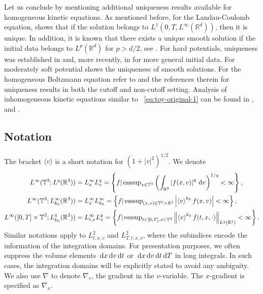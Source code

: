 \documentclass[11pt,american, reqno]{amsart}
\numberwithin{equation}{section}
\newcommand{\R}{\mathbb R}
\newcommand{\1}{\mathds{1}}
\newcommand{\dt}{\, {\rm d} t}
\newcommand{\dT}{\, {\rm d} T}
\newcommand{\dv}{\, {\rm d} v}
\newcommand{\dx}{\, {\rm d} x}
\newcommand{\vpran}[1]{\left(#1\right)}
\newcommand{\norm}[1]{\left\lVert#1\right\rVert}
\newcommand{\abs}[1]{\left\vert#1\right\vert}
\newcommand{\vint}[1]{\left\langle#1\right\rangle}
\newcommand{\T}{\mathbb{T}}
\numberwithin{equation}{section}
\begin{document}
Let us conclude by mentioning additional uniqueness results available for homogeneous kinetic equations. As mentioned before, for the Landau-Coulomb equation,  \cite{Fournier10} shows that if the solution belongs to $L^1(0,T,L^{\infty}(\mathbb{R}^d))$, then it is unique.  In addition, it is known that there exists a unique smooth solution if the initial data belongs to $L^p(\mathbb{R}^d)$ for $p>d/2$, see \cite{GGL25}. 
%
For hard potentials, uniqueness was established in \cite{DV00} and, more recently, in \cite{FH21} for more general initial data. For moderately soft potential \cite{ALL15} shows the uniqueness of smooth solutions.  For the homogeneous Boltzmann equation refer to \cite{Fournier08} and the references therein for uniqueness results in both the cutoff and non-cutoff setting. Analysis of inhomogeneous kinetic equations similar to ~\eqref{eq:toy-original-1} can be found in \cite{Ancheschi-Zhu}, \cite{LWY18} and \cite{Imbert-Mouhot}. 

 

 
\subsection{Notation} The bracket $\langle v \rangle $ is a short notation for $ (1+ |v|^2)^{1/2}$. We denote
\begin{align*}
 L^\infty(\T^3; L^q(\R^3))
&=L^\infty_x L^q_v
= \left\{f | \, \text{esssup}_{x \in \T^3} \vpran{\int_{\R^3} \abs{f(x, v)}^q \dv}^{1/q} < \infty \right\},
\\
 L^\infty(\T^3; L^\infty_{k_0}(\R^3))
&=L^\infty_x L^\infty_{k_0}
= \left\{f | \, \text{esssup}_{(x, v) \in \T^3 \times \R^3} \abs{\vint{v}^{k_0} f(x, v)} < \infty \right\},
\\
 L^\infty([0, T] \times \T^3; L^q_{k_0}(\R^3))
&=L^\infty_{t, x} L^q_v
= \left\{f | \, \text{esssup}_{t \in [0, T], x \in \T^3} \norm{\vint{v}^{k_0} f(t,x,\cdot)}_{L^q(\R^3)} < \infty \right\}.
\end{align*}
Similar notations apply to $L^2_{t,x,v}$ and $L^2_{T,t,x,v}$, where the subindices encode the information of the integration domains. For presentation purposes, we often suppress the volume elements $\dx\dv\dt$ or $\dx\dv\dt\dT$ in long integrals. In such cases, the integration domains will be explicitly stated to avoid any ambiguity. We also use $\nabla$ to denote $\nabla_v$, the gradient in the $v$-variable. The $x$-gradient is specified as $\nabla_x$.
\end{document}
